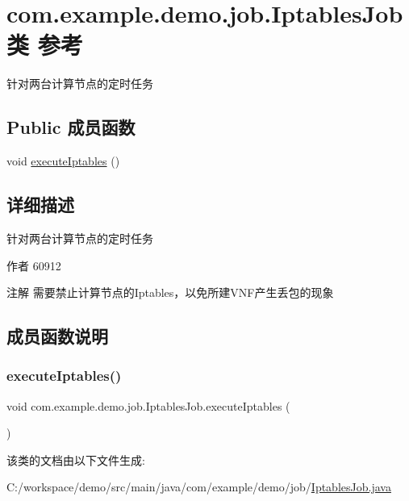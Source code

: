 \hypertarget{classcom_1_1example_1_1demo_1_1job_1_1_iptables_job}{}\section{com.\+example.\+demo.\+job.\+Iptables\+Job类 参考}
\label{classcom_1_1example_1_1demo_1_1job_1_1_iptables_job}


针对两台计算节点的定时任务  


\subsection*{Public 成员函数}
\begin{DoxyCompactItemize}
\item 
void \mbox{\hyperlink{classcom_1_1example_1_1demo_1_1job_1_1_iptables_job_a4b578e0f06e1053ff4869b17ed3e46eb}{execute\+Iptables}} ()
\end{DoxyCompactItemize}


\subsection{详细描述}
针对两台计算节点的定时任务 

\begin{DoxyAuthor}{作者}
60912 
\end{DoxyAuthor}
\begin{DoxyNote}{注解}
需要禁止计算节点的\+Iptables，以免所建\+V\+N\+F产生丢包的现象 
\end{DoxyNote}


\subsection{成员函数说明}
\mbox{\label{classcom_1_1example_1_1demo_1_1job_1_1_iptables_job_a4b578e0f06e1053ff4869b17ed3e46eb}} 
\subsubsection{\texorpdfstring{execute\+Iptables()}{executeIptables()}}
{\footnotesize\ttfamily void com.\+example.\+demo.\+job.\+Iptables\+Job.\+execute\+Iptables (\begin{DoxyParamCaption}{ }\end{DoxyParamCaption})}



该类的文档由以下文件生成\+:\begin{DoxyCompactItemize}
\item 
C\+:/workspace/demo/src/main/java/com/example/demo/job/\mbox{\hyperlink{_iptables_job_8java}{Iptables\+Job.\+java}}\end{DoxyCompactItemize}
